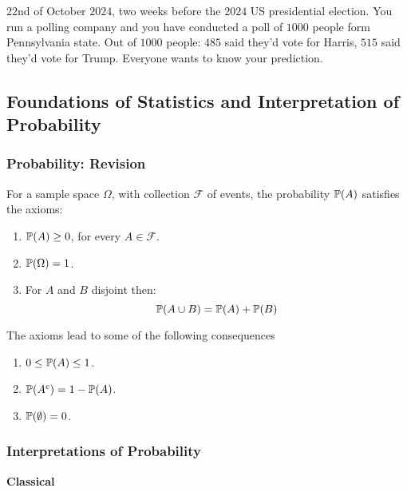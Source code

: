 \documentclass[10pt, a4paper]{article}
\begin{document}
\begin{example}
    $22$nd of October $2024$,
    two weeks before the $2024$ US presidential election.
    You run a polling company and you have conducted a poll of $1000$ people form Pennsylvania state.
    Out of $1000$ people:
    $485$ said they'd vote for Harris,
    $515$ said they'd vote for Trump.
    Everyone wants to know your prediction.
\end{example}

\subsection{Foundations of Statistics and Interpretation of Probability}

\subsubsection{Probability: Revision}

\begin{definition}
    For a sample space $\Omega$,
    with collection $\mathcal{F}$ of events,
    the probability $\P(A)$ satisfies the axioms:
    \begin{enumerate}[label = A\arabic*]
        \item $\P(A) \geq 0$,
        for every $A \in \mathcal{F}$.

        \item $\P(\Omega) = 1$.

        \item For $A$ and $B$ disjoint then:
        \[
        \P(A \cup B) = \P(A) + \P(B)
        \]
    \end{enumerate}
\end{definition}

The axioms lead to some of the following consequences
\begin{proposition}
    \begin{enumerate}[label = (\roman*)]
        \item $0 \leq \P(A) \leq 1$.
        
        \item $\P(A ^ c) = 1 - \P(A)$.
        
        \item $\P(\emptyset) = 0$.
    \end{enumerate}
\end{proposition}

\subsubsection{Interpretations of Probability}
\textbf{Classical}
\end{document}
